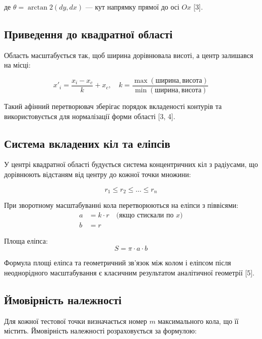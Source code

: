 \documentclass[12pt,a4paper]{article}
\begin{document}
де $\theta = \arctan2(dy, dx)$ — кут напрямку прямої до осі $Ox$ [3].

\subsection{Приведення до квадратної області}

Область масштабується так, щоб ширина дорівнювала висоті, а центр залишався на місці:

\begin{equation}
x'_i = \frac{x_i - x_c}{k} + x_c, \quad k = \frac{\max(\text{ширина}, \text{висота})}{\min(\text{ширина}, \text{висота})}
\end{equation}

Такий афінний перетворювач зберігає порядок вкладеності контурів та використовується для нормалізації форми області [3, 4].

\subsection{Система вкладених кіл та еліпсів}

У центрі квадратної області будується система концентричних кіл з радіусами, що дорівнюють відстаням від центру до кожної точки множини:

\begin{equation}
r_1 \leq r_2 \leq \ldots \leq r_n
\end{equation}

При зворотному масштабуванні кола перетворюються на еліпси з піввісями:
\begin{align}
a &= k \cdot r \quad \text{(якщо стискали по } x\text{)} \\
b &= r
\end{align}

Площа еліпса:
\begin{equation}
S = \pi \cdot a \cdot b
\end{equation}

Формула площі еліпса та геометричний зв'язок між колом і еліпсом після неоднорідного масштабування є класичним результатом аналітичної геометрії [5].

\subsection{Ймовірність належності}

Для кожної тестової точки визначається номер $m$ максимального кола, що її містить. Ймовірність належності розраховується за формулою:
\end{document}
